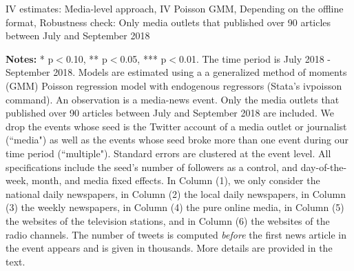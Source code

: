 \clearpage
\pagebreak
\begin{table}
\caption{IV estimates: Media-level approach, IV Poisson GMM, Depending on the offline format, Robustness check: Only media outlets that published over 90 articles between July and September 2018}
\begin{center}
	
\end{center}
\begin{spacing}{0.5}
	{\fns \textbf{Notes:} * p$<$0.10, ** p$<$0.05, *** p$<$0.01. The time period is July 2018 - September 2018. Models are estimated using a a generalized method of moments (GMM) Poisson regression model with endogenous regressors (Stata's ivpoisson command). An observation is a media-news event. Only the media outlets that published over 90 articles between July and September 2018 are included. We drop the events whose seed is the Twitter account of a media outlet or journalist (``media") as well as the events whose seed broke more than one event during our time period (``multiple"). Standard errors are clustered at the event level. All specifications include the seed's number of followers as a control, and day-of-the-week, month, and media fixed effects.  In Column (1), we only consider the national daily newspapers, in Column (2) the local daily newspapers, in Column (3) the weekly newspapers, in Column (4) the pure online media, in Column (5) the websites of the television stations, and in Column (6) the websites of the radio channels.	The number of tweets is computed \textit{before} the first news article in the event appears and is given in thousands. More details are provided in the text.}
\end{spacing}
\label{Tab:regression_media_IV_Poisson_GMM_R90articles}
\end{table} 


\clearpage 
\pagebreak